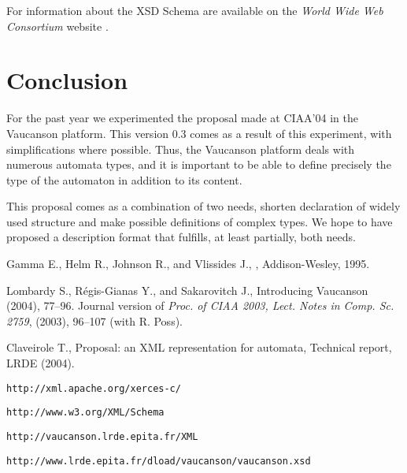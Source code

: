 \documentclass[a4paper]{article}
\newcommand{\Vauc}{{\sc Vaucanson}\xspace}
\begin{document}
For information about the XSD Schema are available on the
\textit{World Wide Web Consortium} website \cite{W3C}.

\section{Conclusion}

For the past year we experimented the proposal made at CIAA'04 in the
\Vauc platform. This version 0.3 comes as a result of this
experiment, with simplifications where possible. Thus, the
\Vauc platform deals with numerous automata types, and it is important
to be able to define precisely the type of the automaton in addition
to its content.

This proposal comes as a combination of two needs, shorten declaration
of widely used structure and make possible definitions of complex
types. We hope to have proposed a description format that fulfills, at
least partially, both needs.

{\small%
\begin{thebibliography}{1}

{\sc Gamma E., Helm R., Johnson R., and Vlissides J.},
,
\newblock Addison-Wesley, 1995.

{\sc Lombardy S., R\'egis-Gianas Y., and Sakarovitch J.},
\newblock Introducing Vaucanson
 (2004), 77--96.
\newblock Journal version of
{\em Proc. of CIAA 2003, Lect. Notes in Comp. Sc. 2759}, (2003),
96--107
\newblock (with {\sc R. Poss}).

{\sc Claveirole T.},
\newblock Proposal: an XML representation for automata,
\newblock Technical report, LRDE (2004).


\verb+http://xml.apache.org/xerces-c/+

\verb+http://www.w3.org/XML/Schema+

\verb+http://vaucanson.lrde.epita.fr/XML+

\verb+http://www.lrde.epita.fr/dload/vaucanson/vaucanson.xsd+
\end{thebibliography}}
\end{document}
